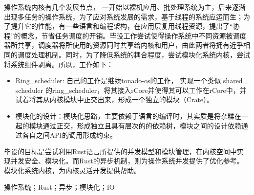 \setlength{\headheight}{1.5cm}

\abstractcn


操作系统内核有几个发展节点， 一开始以裸机应用、批处理系统为主，后来逐渐出现多任务的操作系统，为了应对系统发展的需求，基于线程的系统应运而生；为了提升它的性能，有一些语言和编程架构，在应用层复用线程资源，提出了“协程”的概念，节省任务调度的开销。毕设工作尝试使得操作系统中不同资源被调度器所共享，调度器将所使用的资源同时共享给内核和用户，由此两者将拥有近乎相同的调度处理机制。同时，为了降低系统的耦合程度，尝试模块化系统内核，尝试将系统组件剥离。所以，工作如下：

\begin{itemize}
\item Ring\_scheduler: 自己的工作是继续tonado-os的工作， 实现一个类似 shared\_ scheduler 的ring\_scheduler，将其接入rCore并使得其可以工作在rCore中，并试着将其从内核模块中正交出来，形成一个独立的模块（Crate）。 

\item 模块化的设计：模块化思路，主要依赖于语言的编译时，其实质是将杂糅在一起的模块通过正交，形成独立且具有层次的的依赖树，模块之间的设计依赖通过各自之间API的调用形成约束。
\end{itemize}


毕设的目标是尝试利用Rust语言所提供的并发模型和模块管理，在内核空间中实现并发安全、模块化。而Rust的异步机制，则为操作系统并发提供了优化参考。模块化系统内核，为内核灵活开发提供帮助。

\keywordscn\quad 操作系统；Rust；异步；模块化；IO
\abstracten


